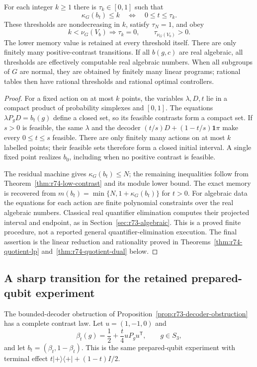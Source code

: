 \begin{theorem}
\label{thm:r74-contrast-thresholds}
For each integer $k\ge1$ there is $\tau_k\in[0,1]$ such that
\begin{equation}\label{eq:r74-threshold-set}
 \kappa_G(b_t)\le k\quad\Longleftrightarrow\quad 0\le t\le\tau_k.
\end{equation}
These thresholds are nondecreasing in $k$, satisfy $\tau_N=1$, and obey
\[
 k<\nu_G(V_b)\Longrightarrow\tau_k=0,
 \qquad \tau_{\nu_G(V_b)}>0.
\]
The lower memory value is retained at every threshold itself. There are
only finitely many positive-contrast transitions. If all $b(g,c)$ are real
algebraic, all thresholds are effectively computable real algebraic numbers.
When all subgroups of $G$ are normal, they are obtained by finitely many
linear programs; rational tables then have rational thresholds and rational
optimal controllers.
\end{theorem}
\begin{proof}
For a fixed action on at most $k$ points, the variables $\lambda,D,t$ lie
in a compact product of probability simplexes and $[0,1]$. The equations
$\lambda P_gD=b_t(g)$ define a closed set, so its feasible contrasts form
a compact set. If $s>0$ is feasible, the same $\lambda$ and the decoder
$(t/s)D+(1-t/s)\mathbf1\pi$ make every $0\le t\le s$ feasible.
There are only finitely many actions on at most $k$ labelled points;
their feasible sets therefore form a closed initial interval. A single
fixed point realizes $b_0$, including when no positive contrast is feasible.

The residual machine gives $\kappa_G(b_t)\le N$; the remaining inequalities
follow from Theorem~\ref{thm:r74-low-contrast} and its module lower bound.
The exact memory is recovered from
$m(b_t)=\min\{N,1+\kappa_G(b_t)\}$ for $t>0$.
For algebraic data the equations for each action are finite polynomial
constraints over the real algebraic numbers. Classical real quantifier
elimination computes their projected interval and endpoint, as in
Section~\ref{sec:r73-algebraic}. This is a proved finite procedure,
not a reported general quantifier-elimination execution. The final assertion
is the linear reduction and rationality proved in
Theorems~\ref{thm:r74-quotient-lp} and~\ref{thm:r74-quotient-dual} below.
\end{proof}

\subsection{A sharp transition for the retained prepared-qubit experiment}
The bounded-decoder obstruction of
Proposition~\ref{prop:r73-decoder-obstruction} has a complete contrast law.
Let $u=(1,-1,0)$ and
\[
 \beta_t(g)=\frac12+\frac t4uP_gu^{\mathsf T},\qquad g\in S_3,
\]
and let $b_t=(\beta_t,1-\beta_t)$. This is the same prepared-qubit
experiment with terminal effect $t|+\rangle\langle+|+(1-t)I/2$.

